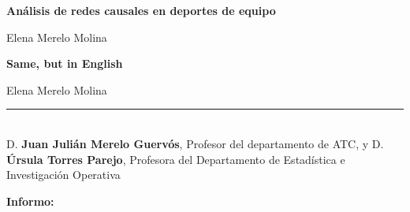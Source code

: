 \thispagestyle{empty}

\begin{center}
{\large\bfseries Análisis de redes causales en deportes de equipo }\\
\end{center}
\begin{center}
Elena Merelo Molina\\
\end{center}


\vspace{0.5cm}
\vspace{0.7cm}

\cleardoublepage

\begin{center}
	{\large\bfseries Same, but in English}\\
\end{center}
\begin{center}
	Elena Merelo Molina\\
\end{center}
\vspace{0.5cm}
\vspace{0.7cm}

\cleardoublepage

\thispagestyle{empty}

\noindent\rule[-1ex]{\textwidth}{2pt}\\[4.5ex]

D. \textbf{Juan Julián Merelo Guervós}, Profesor del departamento de ATC, y D. \textbf{Úrsula Torres Parejo}, 
Profesora del Departamento de Estadística e Investigación Operativa

\vspace{0.5cm}

\textbf{Informo:}

\vspace{0.5cm}

